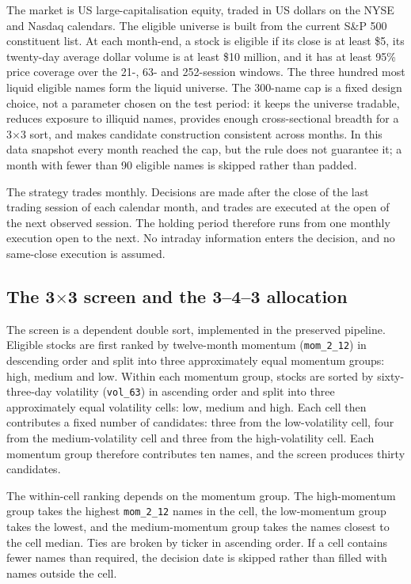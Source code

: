 \documentclass[11pt,a4paper]{article}
\begin{document}
The market is US large-capitalisation equity, traded in US dollars on the NYSE and Nasdaq calendars. The eligible universe is built from the current S\&P 500 constituent list. At each month-end, a stock is eligible if its close is at least \$5, its twenty-day average dollar volume is at least \$10 million, and it has at least 95\% price coverage over the 21-, 63- and 252-session windows. The three hundred most liquid eligible names form the liquid universe. The 300-name cap is a fixed design choice, not a parameter chosen on the test period: it keeps the universe tradable, reduces exposure to illiquid names, provides enough cross-sectional breadth for a 3$\times$3 sort, and makes candidate construction consistent across months. In this data snapshot every month reached the cap, but the rule does not guarantee it; a month with fewer than 90 eligible names is skipped rather than padded.

The strategy trades monthly. Decisions are made after the close of the last trading session of each calendar month, and trades are executed at the open of the next observed session. The holding period therefore runs from one monthly execution open to the next. No intraday information enters the decision, and no same-close execution is assumed.

\subsection{The 3$\times$3 screen and the 3--4--3 allocation}

The screen is a dependent double sort, implemented in the preserved pipeline. Eligible stocks are first ranked by twelve-month momentum (\texttt{mom\_2\_12}) in descending order and split into three approximately equal momentum groups: high, medium and low. Within each momentum group, stocks are sorted by sixty-three-day volatility (\texttt{vol\_63}) in ascending order and split into three approximately equal volatility cells: low, medium and high. Each cell then contributes a fixed number of candidates: three from the low-volatility cell, four from the medium-volatility cell and three from the high-volatility cell. Each momentum group therefore contributes ten names, and the screen produces thirty candidates.

The within-cell ranking depends on the momentum group. The high-momentum group takes the highest \texttt{mom\_2\_12} names in the cell, the low-momentum group takes the lowest, and the medium-momentum group takes the names closest to the cell median. Ties are broken by ticker in ascending order. If a cell contains fewer names than required, the decision date is skipped rather than filled with names outside the cell.
\end{document}
